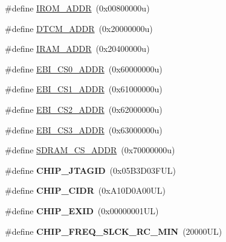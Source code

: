 \begin{DoxyCompactItemize}
\item 
\#define \mbox{\hyperlink{group__SAME70N19__definitions_ga694212ffb8c2786bacee3d0ad6020bda}{I\+R\+O\+M\+\_\+\+A\+D\+DR}}~(0x00800000u)
\item 
\#define \mbox{\hyperlink{group__SAME70N19__definitions_ga26626a425f7ebb3a0c2dbc276f0d9f78}{D\+T\+C\+M\+\_\+\+A\+D\+DR}}~(0x20000000u)
\item 
\#define \mbox{\hyperlink{group__SAME70N19__definitions_gaae45ac2ef16942159481c767ac4805cf}{I\+R\+A\+M\+\_\+\+A\+D\+DR}}~(0x20400000u)
\item 
\#define \mbox{\hyperlink{group__SAME70N19__definitions_ga9bcbb97ddae3b2cc5e2c9613d33f66b4}{E\+B\+I\+\_\+\+C\+S0\+\_\+\+A\+D\+DR}}~(0x60000000u)
\item 
\#define \mbox{\hyperlink{group__SAME70N19__definitions_gaaddd9fdbbc77c9aced5308819f502a26}{E\+B\+I\+\_\+\+C\+S1\+\_\+\+A\+D\+DR}}~(0x61000000u)
\item 
\#define \mbox{\hyperlink{group__SAME70N19__definitions_ga058a35f9991487dc2dd12ada792d0730}{E\+B\+I\+\_\+\+C\+S2\+\_\+\+A\+D\+DR}}~(0x62000000u)
\item 
\#define \mbox{\hyperlink{group__SAME70N19__definitions_gad66ebdd0fc33ec3cf85dbaa14bbf05d9}{E\+B\+I\+\_\+\+C\+S3\+\_\+\+A\+D\+DR}}~(0x63000000u)
\item 
\#define \mbox{\hyperlink{group__SAME70N19__definitions_ga61b7db25daf759c2a2beb6e5a0b57a84}{S\+D\+R\+A\+M\+\_\+\+C\+S\+\_\+\+A\+D\+DR}}~(0x70000000u)
\item 
\mbox{\label{group__SAME70N19__definitions_gaa614519778eec0df55d3eeab3223e3f6}} 
\#define {\bfseries C\+H\+I\+P\+\_\+\+J\+T\+A\+G\+ID}~(0x05\+B3\+D03\+F\+U\+L)
\item 
\mbox{\label{group__SAME70N19__definitions_ga1e1ae44dd9269a8a98c1d7e7a60e9fbd}} 
\#define {\bfseries C\+H\+I\+P\+\_\+\+C\+I\+DR}~(0x\+A10\+D0\+A00\+U\+L)
\item 
\mbox{\label{group__SAME70N19__definitions_ga35123717aa86b76bb6b73cf3adc4c2e6}} 
\#define {\bfseries C\+H\+I\+P\+\_\+\+E\+X\+ID}~(0x00000001\+U\+L)
\item 
\mbox{\label{group__SAME70N19__definitions_ga0e868bf27426399dfdcb3a9dfc3733c4}} 
\#define {\bfseries C\+H\+I\+P\+\_\+\+F\+R\+E\+Q\+\_\+\+S\+L\+C\+K\+\_\+\+R\+C\+\_\+\+M\+IN}~(20000\+U\+L)

\end{DoxyCompactItemize}

